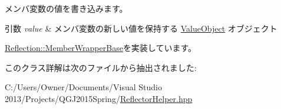 メンバ変数の値を書き込みます。


\begin{DoxyParams}{引数}
{\em value} & メンバ変数の新しい値を保持する \hyperlink{class_reflection_1_1_value_object}{Value\+Object} オブジェクト\\
\hline
\end{DoxyParams}


\hyperlink{class_reflection_1_1_member_wrapper_base_ac85dcf08d50b726f633df60ec42a53bb}{Reflection\+::\+Member\+Wrapper\+Base}を実装しています。



このクラス詳解は次のファイルから抽出されました\+:\begin{DoxyCompactItemize}
\item 
C\+:/\+Users/\+Owner/\+Documents/\+Visual Studio 2013/\+Projects/\+Q\+G\+J2015\+Spring/\hyperlink{_reflector_helper_8hpp}{Reflector\+Helper.\+hpp}\end{DoxyCompactItemize}
